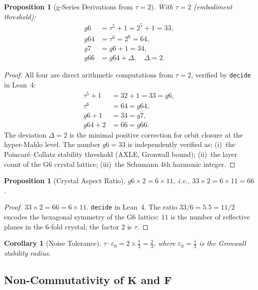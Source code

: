 \documentclass[12pt,a4paper]{amsart}
\newtheorem{proposition}[theorem]{Proposition}
\newtheorem{corollary}[theorem]{Corollary}
\theoremstyle{definition}
\theoremstyle{remark}
\newcommand{\Kop}{\mathbf{K}}
\newcommand{\Fop}{\mathbf{F}}
\begin{document}
\begin{proposition}[g-Series Derivations from $\tau=2$]\label{prop:gseries}
With $\tau = 2$ (embodiment threshold):
\begin{align}
g6  &= \tau^5 + 1 = 2^5 + 1 = 33, \label{eq:g6}\\
g64 &= \tau^6 = 2^6 = 64, \label{eq:g64}\\
g7  &= g6 + 1 = 34, \label{eq:g7}\\
g66 &= g64 + \Delta,\quad \Delta = 2. \label{eq:g66}
\end{align}
\end{proposition}
\begin{proof}
All four are direct arithmetic computations from $\tau=2$, verified by
\texttt{decide} in Lean~4:
\begin{align*}
\tau^5 + 1 &= 32 + 1 = 33 = g6, \\
\tau^6     &= 64 = g64, \\
g6  + 1    &= 34 = g7, \\
g64 + 2    &= 66 = g66.
\end{align*}
The deviation $\Delta = 2$ is the minimal positive correction for
orbit closure at the hyper-Mahlo level.
The number $g6 = 33$ is independently verified as:
(i)~the Poincar\'e--Collatz stability threshold (AXLE, Gronwall bound);
(ii)~the layer count of the G6 crystal lattice;
(iii)~the Schumann 4th harmonic integer.
\end{proof}

\begin{proposition}[Crystal Aspect Ratio]\label{prop:crystal}
$g6 \times 2 = 6 \times 11$, i.e., $33 \times 2 = 6 \times 11 = 66$.
\end{proposition}
\begin{proof}
$33 \times 2 = 66 = 6 \times 11$. \texttt{decide} in Lean~4.
The ratio $33/6 = 5.5 = 11/2$ encodes the hexagonal symmetry of the G6
lattice: $11$ is the number of reflective planes in the 6-fold crystal;
the factor $2$ is $\tau$.
\end{proof}

\begin{corollary}[Noise Tolerance]\label{cor:noise}
$\tau \cdot \varepsilon_0 = 2 \times \tfrac{1}{3} = \tfrac{2}{3}$,
where $\varepsilon_0 = \tfrac{1}{3}$ is the Gronwall stability radius.
\end{corollary}

\subsection{Non-Commutativity of $\Kop$ and $\Fop$}
\end{document}
